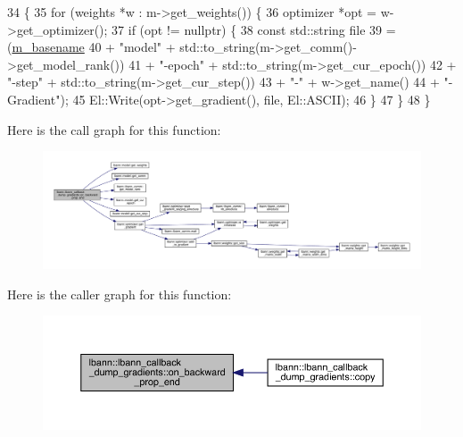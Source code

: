 \begin{DoxyCode}
34                                                                  \{
35   \textcolor{keywordflow}{for} (weights *w : m->get\_weights()) \{
36     optimizer *opt = w->get\_optimizer();
37     \textcolor{keywordflow}{if} (opt != \textcolor{keyword}{nullptr}) \{
38       \textcolor{keyword}{const} std::string file
39         = (\hyperlink{classlbann_1_1lbann__callback__dump__gradients_a5c8236660ca8b1cb61dddcd1264821ca}{m\_basename}
40            + \textcolor{stringliteral}{"model"} + std::to\_string(m->get\_comm()->get\_model\_rank())
41            + \textcolor{stringliteral}{"-epoch"} + std::to\_string(m->get\_cur\_epoch())
42            + \textcolor{stringliteral}{"-step"} + std::to\_string(m->get\_cur\_step())
43            + \textcolor{stringliteral}{"-"} + w->get\_name()
44            + \textcolor{stringliteral}{"-Gradient"});
45       El::Write(opt->get\_gradient(), file, El::ASCII);
46     \}
47   \}
48 \}
\end{DoxyCode}
Here is the call graph for this function\+:\nopagebreak
\begin{figure}[H]
\begin{center}
\leavevmode
\includegraphics[width=350pt]{classlbann_1_1lbann__callback__dump__gradients_a2485599f66842eda62c8bc8d4d44ef02_cgraph}
\end{center}
\end{figure}
Here is the caller graph for this function\+:\nopagebreak
\begin{figure}[H]
\begin{center}
\leavevmode
\includegraphics[width=350pt]{classlbann_1_1lbann__callback__dump__gradients_a2485599f66842eda62c8bc8d4d44ef02_icgraph}
\end{center}
\end{figure}
\mbox{\label{classlbann_1_1lbann__callback__dump__gradients_a31986866a3865159eb1680e5affba1f1}} 
